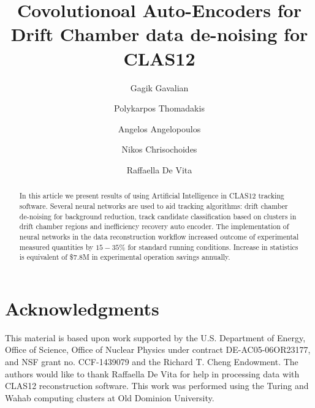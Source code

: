 \documentclass[preprint,12pt]{elsarticle}
\title{Covolutionoal Auto-Encoders for Drift Chamber data de-noising for CLAS12}
\author[1]{Gagik Gavalian}
\author[2]{Polykarpos Thomadakis}
\author[2]{Angelos Angelopoulos}
\author[2]{Nikos Chrisochoides}
\author[3]{Raffaella De Vita}
\begin{document}
\begin{abstract}

In this article we present results of using Artificial Intelligence in CLAS12 tracking software. Several neural networks are used to aid tracking algorithms: drift chamber de-noising for background reduction, track candidate classification based on clusters in drift chamber regions and inefficiency recovery auto encoder. The implementation of neural networks in the data reconstruction workflow increased outcome of experimental measured quantities by $15-35\%$ for standard running conditions. Increase in statistics is equivalent of \$$7.8$M in experimental operation savings annually.

\end{abstract}
\maketitle












%
%



\newpage

\section{Acknowledgments}

This material is based upon work supported by the U.S. Department of Energy, Office of Science,
Office of Nuclear Physics under contract DE-AC05-06OR23177, and NSF grant no. CCF-1439079 and
the Richard T. Cheng Endowment. The authors would like to thank Raffaella De Vita for help in
processing data with CLAS12 reconstruction software. This work was performed using the Turing
and Wahab computing clusters at Old Dominion University.
 
\newpage


\end{document}
